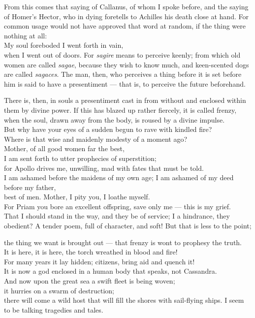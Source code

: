  From this comes that saying of Callanus, of whom I spoke before, and the saying of Homer's Hector, who in dying foretells to Achilles his death close at hand. For common usage would not have approved that word at random, if the thing were nothing at all: \\ My soul foreboded I went forth in vain, \\ when I went out of doors. For \textit{sagire} means to perceive keenly; from which old women are called \textit{sagae}, because they wish to know much, and keen-scented dogs are called \textit{sagaces}. The man, then, who perceives a thing before it is set before him is said to have a presentiment — that is, to perceive the future beforehand.

 There is, then, in souls a presentiment cast in from without and enclosed within them by divine power. If this has blazed up rather fiercely, it is called frenzy, when the soul, drawn away from the body, is roused by a divine impulse. \\ But why have your eyes of a sudden begun to rave with kindled fire? \\ Where is that wise and maidenly modesty of a moment ago? \\ Mother, of all good women far the best, \\ I am sent forth to utter prophecies of superstition; \\ for Apollo drives me, unwilling, mad with fates that must be told. \\ I am ashamed before the maidens of my own age; I am ashamed of my deed before my father, \\ best of men. Mother, I pity you, I loathe myself. \\ For Priam you bore an excellent offspring, save only me — this is my grief. \\ That I should stand in the way, and they be of service; I a hindrance, they obedient? A tender poem, full of character, and soft! But that is less to the point;

 the thing we want is brought out — that frenzy is wont to prophesy the truth. \\ It is here, it is here, the torch wreathed in blood and fire! \\ For many years it lay hidden; citizens, bring aid and quench it! \\ It is now a god enclosed in a human body that speaks, not Cassandra. \\ And now upon the great sea a swift fleet is being woven; \\ it hurries on a swarm of destruction; \\ there will come a wild host that will fill the shores with sail-flying ships. I seem to be talking tragedies and tales.

